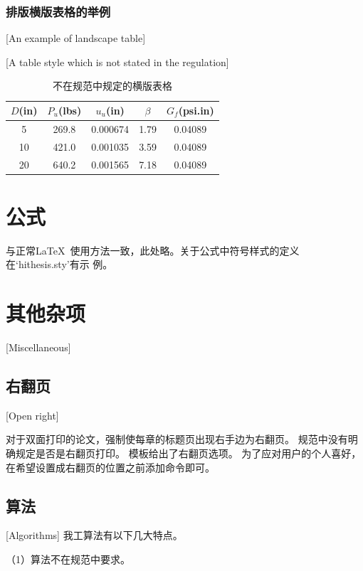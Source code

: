\subsubsection{排版横版表格的举例}[An example of landscape table]

\begin{table}[p]
\centering
\begin{sideways}
\begin{minipage}{\textheight}
\caption{不在规范中规定的横版表格}[A table style which is not stated in the regulation]
\centering\wuhao
\begin{tabular}{ccccc}
\toprule
$D$(in) & $P_u$(lbs) & $u_u$(in) & $\beta$ & $G_f$(psi.in)\\
\midrule
 5 & 269.8 & 0.000674 & 1.79 & 0.04089\\
10 & 421.0 & 0.001035 & 3.59 & 0.04089\\
20 & 640.2 & 0.001565 & 7.18 & 0.04089\\
\bottomrule
\end{tabular}
\end{minipage}
\end{sideways}
\end{table}


\section{公式}
与正常\LaTeX\ 使用方法一致，此处略。关于公式中符号样式的定义在`hithesis.sty'有示
例。

\section{其他杂项}[Miscellaneous]

\subsection{右翻页}[Open right]

对于双面打印的论文，强制使每章的标题页出现右手边为右翻页。
规范中没有明确规定是否是右翻页打印。
模板给出了右翻页选项。
为了应对用户的个人喜好，在希望设置成右翻页的位置之前添加命令即可。

\subsection{算法}[Algorithms]
我工算法有以下几大特点。

（1）算法不在规范中要求。

